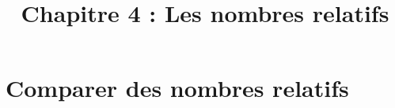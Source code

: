 \title{\vspace{-2em}Chapitre 4 : Les nombres relatifs\vspace{-3em}}%
\date{ }
\maketitle


\section{Comparer des nombres relatifs}




% 
